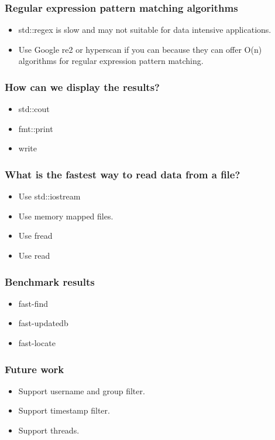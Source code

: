 \documentclass[bigger]{beamer}
\begin{document}
\begin{frame}
    \frametitle{Regular expression pattern matching algorithms}
    \begin{itemize}
    \item std::regex is slow and may not suitable for data intensive
        applications.
    \item Use Google re2 or hyperscan if you can because they can offer O(n)
        algorithms for regular expression pattern matching.
    \end{itemize}
\end{frame}

\begin{frame}
    \frametitle{How can we display the results?}
    \begin{itemize}
        \item std::cout
        \item fmt::print
        \item write
    \end{itemize}
\end{frame}

\begin{frame}
    \frametitle{What is the fastest way to read data from a file?}
    \begin{itemize}
        \item Use std::iostream
        \item Use memory mapped files.
        \item Use fread
        \item Use read
    \end{itemize}
\end{frame}

\begin{frame}
    \frametitle{Benchmark results}
    \begin{itemize}
    \item fast-find
    \item fast-updatedb
    \item fast-locate
    \end{itemize}
\end{frame}

\begin{frame}
    \frametitle{Future work}
    \begin{itemize}
    \item Support username and group filter.
    \item Support timestamp filter.
    \item Support threads.
    \end{itemize}
\end{frame}
\end{document}
